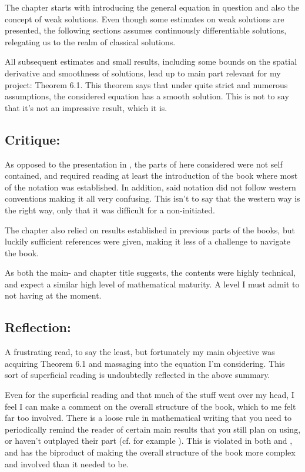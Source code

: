 \documentclass[11pt, a4paper]{article}
\begin{document}
The chapter starts with introducing the general equation in question and also the concept of weak solutions. Even though some estimates on weak solutions are presented, the following sections assumes continuously differentiable solutions, relegating us to the realm of classical solutions.

All subsequent estimates and small results, including some bounds on the spatial derivative  and smoothness of solutions, lead up to main part relevant for my project: Theorem 6.1. This theorem says that under quite strict and numerous assumptions, the considered equation has a smooth solution. This is not to say that it's not an impressive result, which it is.

\subsection{Critique:}
As opposed to the presentation in \cite{evans}, the parts of \cite{ladyzhenskaya} here considered were not self contained, and required reading at least the introduction of the book where most of the notation was established. In addition, said notation did not follow western conventions making it all very confusing. This isn't to say that the western way is the right way, only that it was difficult for a non-initiated.

The chapter also relied on results established in previous parts of the books, but luckily sufficient references were given, making it less of a challenge to navigate the book. 

As both the main- and chapter title suggests, the contents were highly technical, and expect a similar high level of mathematical maturity. A level I must admit to not having at the moment.

\subsection{Reflection:}
A frustrating read, to say the least, but fortunately my main objective was acquiring Theorem 6.1 and massaging into the equation I'm considering. This sort of superficial reading is undoubtedly reflected in the above summary.

Even for the superficial reading and that much of the stuff went over my head, I feel I can  make a comment on the overall structure of the book, which to me felt far too involved. There is a loose rule in mathematical writing that you need to periodically remind the reader of certain main results that you still plan on using, or haven't outplayed their part (cf. for example \cite{halmos1970write}). This is violated in both \cite{ladyzhenskaya} and \cite{vazquez2007porous}, and has the biproduct of making the overall structure of the book more complex and involved than it needed to be.


\newpage


\end{document}
